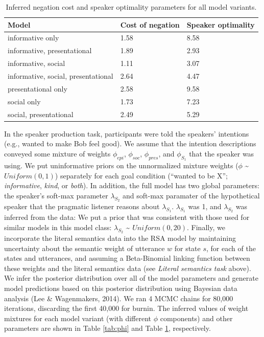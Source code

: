 \documentclass[12pt]{article}
\begin{document}
\begin{table}[tbp]
\begin{center}
\begin{threeparttable}
\caption{\label{tab:otherParams}Inferred negation cost and speaker optimality parameters for all model variants.}
\begin{tabular}{lll}
\toprule
Model & \multicolumn{1}{c}{Cost of negation} & \multicolumn{1}{c}{Speaker optimality}\\
\midrule
informative only & 1.58 & 8.58\\
informative, presentational & 1.89 & 2.93\\
informative, social & 1.11 & 3.07\\
informative, social, presentational & 2.64 & 4.47\\
presentational only & 2.58 & 9.58\\
social only & 1.73 & 7.23\\
social, presentational & 2.49 & 5.29\\
\bottomrule
\end{tabular}
\end{threeparttable}
\end{center}
\end{table}

In the speaker production task, participants were told the speakers'
intentions (e.g., wanted to make Bob feel good). We assume that the
intention descriptions conveyed some mixture of weights \(\phi_{epi}\),
\(\phi_{soc}\), \(\phi_{pres}\), and \(\phi_{S_1}\) that the speaker was
using. We put uninformative priors on the unnormalized mixture weights
(\(\phi\) \textasciitilde{} \(Uniform(0,1)\)) separately for each goal
condition (\enquote{wanted to be X}; \emph{informative}, \emph{kind}, or
\emph{both}). In addition, the full model has two global parameters: the
speaker's soft-max parameter \(\lambda_{S_2}\) and soft-max paramater of
the hypothetical speaker that the pragmatic listener reasons about
\(\lambda_{S_1}\). \(\lambda_{S_1}\) was 1, and \(\lambda_{S_2}\) was
inferred from the data: We put a prior that was consistent with those
used for similar models in this model class: \(\lambda_{S_2}\)
\textasciitilde{} \(Uniform(0,20)\). Finally, we incorporate the literal
semantics data into the RSA model by maintaining uncertainty about the
semantic weight of utterance \(w\) for state \(s\), for each of the
states and utterances, and assuming a Beta-Binomial linking function
between these weights and the literal semantics data (see \emph{Literal
semantics task} above). We infer the posterior distribution over all of
the model parameters and generate model predictions based on this
posterior distribution using Bayesian data analysis (Lee \& Wagenmakers,
2014). We ran 4 MCMC chains for 80,000 iterations, discarding the first
40,000 for burnin. The inferred values of weight mixtures for each model
variant (with different \(\phi\) components) and other parameters are
shown in Table \ref{tab:phi} and Table \ref{tab:otherParams},
respectively.
\end{document}
